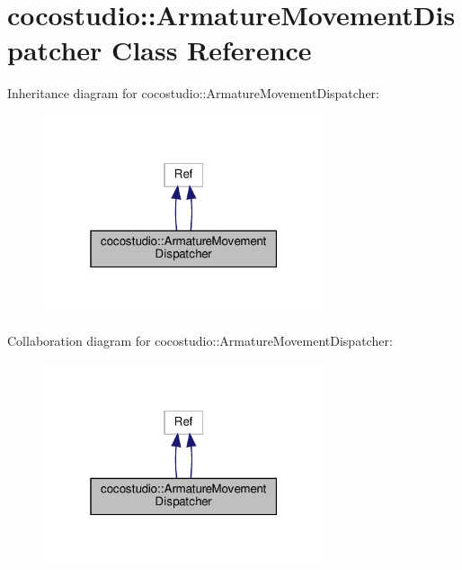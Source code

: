 \hypertarget{classcocostudio_1_1ArmatureMovementDispatcher}{}\section{cocostudio\+:\+:Armature\+Movement\+Dispatcher Class Reference}
\label{classcocostudio_1_1ArmatureMovementDispatcher}


Inheritance diagram for cocostudio\+:\+:Armature\+Movement\+Dispatcher\+:
\nopagebreak
\begin{figure}[H]
\begin{center}
\leavevmode
\includegraphics[width=235pt]{classcocostudio_1_1ArmatureMovementDispatcher__inherit__graph}
\end{center}
\end{figure}


Collaboration diagram for cocostudio\+:\+:Armature\+Movement\+Dispatcher\+:
\nopagebreak
\begin{figure}[H]
\begin{center}
\leavevmode
\includegraphics[width=235pt]{classcocostudio_1_1ArmatureMovementDispatcher__coll__graph}
\end{center}
\end{figure}
